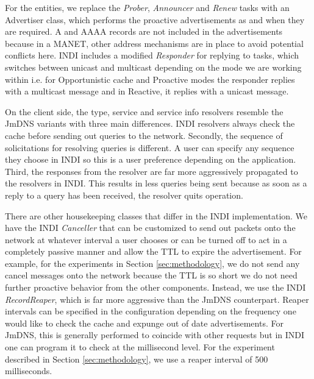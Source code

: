 For the entities, we replace the \emph{Prober}, \emph{Announcer} and \emph{Renew} tasks with an Advertiser class, which performs the proactive advertisements as and when they are required.  A and AAAA records are not included in the advertisements because in a MANET, other address mechanisms are in place to avoid potential conflicts here.  INDI includes a modified \emph{Responder} for replying to tasks, which switches between unicast and multicast depending on the mode we are working within i.e. for Opportunistic cache and Proactive modes the responder replies with a multicast message and in Reactive, it replies with a unicast message.

On the client side, the type, service and service info resolvers resemble the JmDNS variants with three main differences.   INDI resolvers always check the cache before sending out queries to the network.   Secondly, the sequence of solicitations for resolving queries is different.  A user can specify any sequence they choose in INDI so this is a user preference depending on the application.  Third, the responses from the resolver are far more aggressively propagated to the resolvers in INDI.  This results in less queries being sent because as soon as a reply to a query has been received, the resolver quits operation.     
 
There are other housekeeping classes that differ in the INDI implementation.    We have the INDI \emph{Canceller} that can be customized to send out packets onto the network at whatever interval a user chooses or can be turned off to act in a completely passive manner and allow the TTL to expire the advertisement.  For example, for the experiments in Section \ref{sec:methodology}, we do not send any cancel messages onto the network because the TTL is so short we do not need further proactive behavior from the other components.  Instead, we use the INDI \emph{RecordReaper}, which is far more aggressive than the JmDNS counterpart.  Reaper intervals can be specified in the configuration depending on the frequency one would like to check the cache and expunge out of date advertisements.  For JmDNS, this is generally performed to coincide with other requests but in INDI one can program it to check at the millisecond level.   For the experiment described in  Section \ref{sec:methodology}, we use a reaper interval of 500 milliseconds. 

